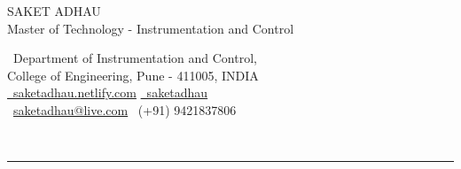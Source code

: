 \documentclass[11pt]{resume}
\newcommand{\makeheading}[2][]
{\hspace*{-\marginparsep minus \marginparwidth}
	\begin{minipage}[t]{\textwidth+\marginparwidth+\marginparsep}
		{\large \bfseries #2 \hfill #1}\\[-0.15\baselineskip]
		\rule{\columnwidth}{0pt}
\end{minipage}}
\providecommand*\email[1]{\href{mailto:#1}{#1}}
\begin{document}
	\makeheading{    
		\begin{center}
			\LARGE{SAKET ADHAU \\ \small{Master of Technology - Instrumentation and Control}} 
		\end{center}
		\newlength{\rcollength}\setlength{\rcollength}{2.35in}%
\begin{center}
	\normalsize{\textnormal{
			\Letter~Department of Instrumentation and Control,\\ College of Engineering, Pune - 411005, INDIA\\				
			\href{https://saketadhau.netlify.com/} 
			{\Mundus~saketadhau.netlify.com}
			\href{https://www.linkedin.com/in/saketadhau/} 
			{\faLinkedinSquare~saketadhau}  \\
			\Email~{\email{saketadhau@live.com}}
			\Mobilefone~(+91) 9421837806}}\vspace{-8mm}
\end{center}
	}\vspace{2mm}
\end{document}
